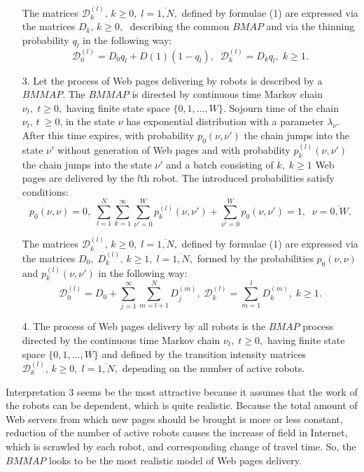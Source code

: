 \documentclass[11pt]{article}
\begin{document}
\begin{itemize}
The matrices  ${\mathcal D}_k^{(l)},\,k\geq 0,\;l=\overline{1,N},$
defined by formulae (1) are expressed via the matrices $D_k,\,k\geq
0,\;$  describing the common $BMAP$ and via the thinning probability
$q_l$ in the following way:
$$
{\mathcal D}^{(l)}_0=D_0q_l + D(1)(1-q_l),\;\; {\mathcal
D}^{(l)}_k=D_k q_l, \; k \ge 1.$$

\item[3.] Let  the process of Web pages delivering by robots is described by
a $BMMAP.$ The $BMMAP$ is directed   by continuous time Markov chain
$\nu_t, \; t \ge 0,$ having finite state space $\{0,1,\dots,W\}$.
Sojourn time of the chain $\nu_t, \, t\ \geq 0$, in the state $\nu$
has exponential distribution with a parameter $\lambda_\nu$. After
this time expires, with probability $p_0(\nu,\nu')$ the chain jumps
into the state $\nu'$ without generation of Web pages and with
probability $p^{(l)}_k(\nu,\nu') $ the chain jumps into the state
$\nu'$ and a batch consisting of $k,\;$$k \geq 1$ Web pages  are
delivered by the $l$th robot.  The introduced probabilities satisfy
conditions:
$$p_0(\nu,\nu)=0,\,\,
\sum\limits_{l=1}^N\sum\limits_{k=1}^\infty \sum\limits_{\nu'=0}^W
p_k^{(l)}(\nu,\nu')+\sum\limits_{\nu'=0}^W p_0(\nu,\nu')=1,\;\;
 \nu=\overline{0,W}.$$

The matrices  ${\mathcal D}_k^{(l)},\,k\geq 0,\;l=\overline{1,N},$
defined by formulae (1) are expressed via the matrices
$D_0,\;D^{(l)}_k,\,k\geq 1,\;l=\overline{1,N},$ formed by the
probabilities $p_0(\nu,\nu)$ and $p_k^{(l)}(\nu,\nu')$ in the
following way:
$$
{\mathcal
D}^{(l)}_0=D_0+\sum\limits_{j=1}^{\infty}\sum\limits_{m=l+1}^{N}D^{(m)}_j,
\;{\mathcal D}^{(l)}_k=\sum\limits_{m=1}^{l}D^{(m)}_k,\;k \ge 1.
$$
\item[4.] The  process of Web pages delivery by all robots is the $BMAP$ process
directed by the   continuous time Markov chain $\nu_t, \; t \ge 0,$
having finite state space $\{0,1,\dots,W\}$ and defined by the
transition intensity matrices ${\mathcal D}_k^{(l)},\,k\geq
0,\;l=\overline{1,N},$ depending on the number of active robots.
\end{itemize}
Interpretation 3 seems be the most attractive because it assumes
that the work of the robots can be dependent, which is quite
realistic. Because the total amount of Web servers from which new
pages should be brought is more or less constant, reduction of the
number of active robots causes the increase of field in Internet,
which is scrawled by each robot, and corresponding change of travel
time. So, the $BMMAP$ looks to be the most realistic model of Web pages
delivery.
\end{document}
